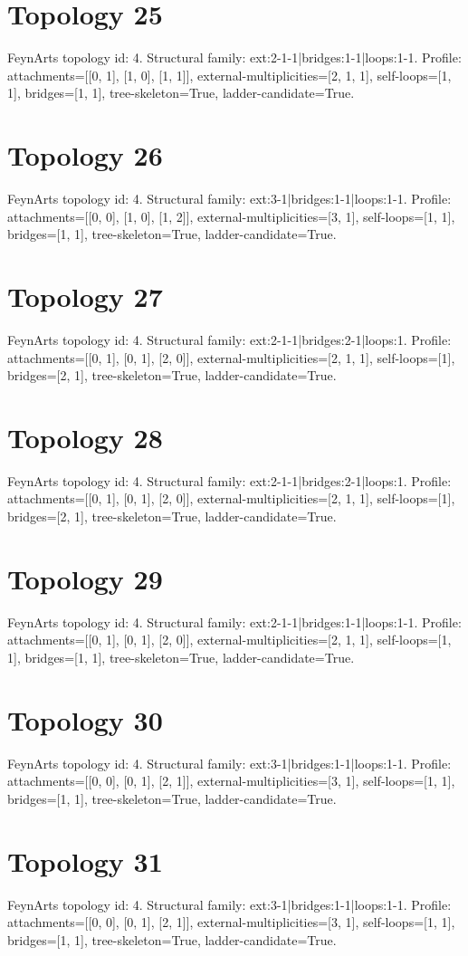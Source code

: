 \documentclass{article}
\begin{document}
\section*{Topology 25}
FeynArts topology id: 4.
Structural family: ext:2-1-1|bridges:1-1|loops:1-1.
Profile: attachments=[[0, 1], [1, 0], [1, 1]], external-multiplicities=[2, 1, 1], self-loops=[1, 1], bridges=[1, 1], tree-skeleton=True, ladder-candidate=True.
\section*{Topology 26}
FeynArts topology id: 4.
Structural family: ext:3-1|bridges:1-1|loops:1-1.
Profile: attachments=[[0, 0], [1, 0], [1, 2]], external-multiplicities=[3, 1], self-loops=[1, 1], bridges=[1, 1], tree-skeleton=True, ladder-candidate=True.
\section*{Topology 27}
FeynArts topology id: 4.
Structural family: ext:2-1-1|bridges:2-1|loops:1.
Profile: attachments=[[0, 1], [0, 1], [2, 0]], external-multiplicities=[2, 1, 1], self-loops=[1], bridges=[2, 1], tree-skeleton=True, ladder-candidate=True.
\section*{Topology 28}
FeynArts topology id: 4.
Structural family: ext:2-1-1|bridges:2-1|loops:1.
Profile: attachments=[[0, 1], [0, 1], [2, 0]], external-multiplicities=[2, 1, 1], self-loops=[1], bridges=[2, 1], tree-skeleton=True, ladder-candidate=True.
\section*{Topology 29}
FeynArts topology id: 4.
Structural family: ext:2-1-1|bridges:1-1|loops:1-1.
Profile: attachments=[[0, 1], [0, 1], [2, 0]], external-multiplicities=[2, 1, 1], self-loops=[1, 1], bridges=[1, 1], tree-skeleton=True, ladder-candidate=True.
\section*{Topology 30}
FeynArts topology id: 4.
Structural family: ext:3-1|bridges:1-1|loops:1-1.
Profile: attachments=[[0, 0], [0, 1], [2, 1]], external-multiplicities=[3, 1], self-loops=[1, 1], bridges=[1, 1], tree-skeleton=True, ladder-candidate=True.
\section*{Topology 31}
FeynArts topology id: 4.
Structural family: ext:3-1|bridges:1-1|loops:1-1.
Profile: attachments=[[0, 0], [0, 1], [2, 1]], external-multiplicities=[3, 1], self-loops=[1, 1], bridges=[1, 1], tree-skeleton=True, ladder-candidate=True.
\end{document}
